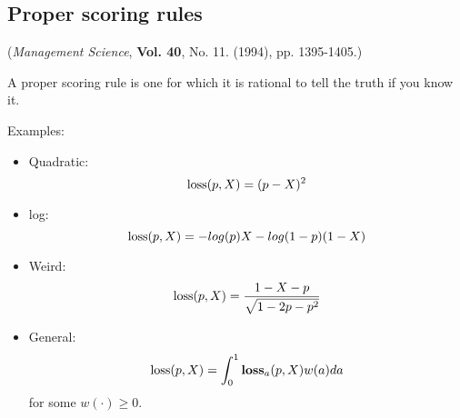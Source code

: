 \documentclass[12pt]{extarticle} %
\begin{document}
\subsection*{Proper scoring rules}

({\em Management Science}, {\bf Vol. 40}, No. 11. (1994), pp. 1395-1405.)

A proper scoring rule is one for which it is rational to tell the
truth if you know it.

Examples:
\begin{itemize}
\item Quadratic:
\begin{displaymath}
\hbox{loss}(p,X) = (p - X)^2
\end{displaymath}
\item log:
\begin{displaymath}
\hbox{loss}(p,X) = -log(p)X - log(1-p)(1-X)
\end{displaymath}
\item Weird:
\begin{displaymath}
\hbox{loss}(p,X) = \frac{1 - X- p}{\sqrt{1 - 2p - p^2}}
\end{displaymath}
\item General:
\begin{displaymath}
\hbox{loss}(p,X) = \int_0^1  \hbox{\bf loss}_a(p,X) w(a) da
\end{displaymath}
for some $w(\cdot)\ge 0$.
\end{itemize}
\end{document}
